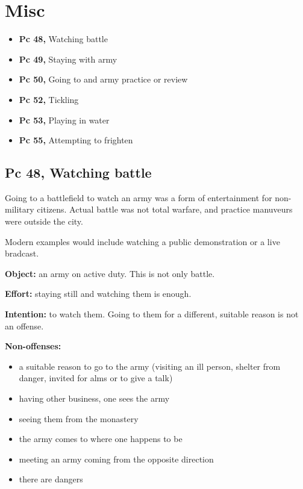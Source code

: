 \chapter{Misc}

\begin{itemize}
\tightlist
\item
  \textbf{Pc 48,} Watching battle
\item
  \textbf{Pc 49,} Staying with army
\item
  \textbf{Pc 50,} Going to and army practice or review
\item
  \textbf{Pc 52,} Tickling
\item
  \textbf{Pc 53,} Playing in water
\item
  \textbf{Pc 55,} Attempting to frighten
\end{itemize}

\section{Pc 48, Watching battle}

\begin{multicols}{2}

Going to a battlefield to watch an army was a form of entertainment for
non-military citizens. Actual battle was not total warfare, and practice
manuveurs were outside the city.

Modern examples would include watching a public demonstration or a live
bradcast.

\textbf{Object:} an army on active duty. This is not only battle.

\textbf{Effort:} staying still and watching them is enough.

\textbf{Intention:} to watch them. Going to them for a different,
suitable reason is not an offense.

\columnbreak

\textbf{Non-offenses:}

\begin{itemize}
\tightlist
\item
  a suitable reason to go to the army (visiting an ill person, shelter
  from danger, invited for alms or to give a talk)
\item
  having other business, one sees the army
\item
  seeing them from the monastery
\item
  the army comes to where one happens to be
\item
  meeting an army coming from the opposite direction
\item
  there are dangers
\end{itemize}

\end{multicols}

